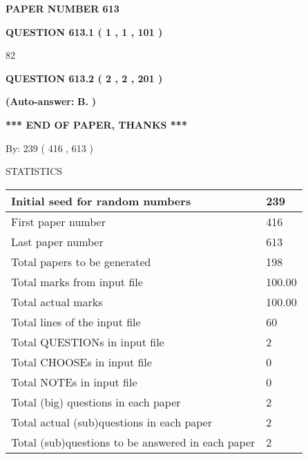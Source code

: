 \documentclass{ctexart}
\begin{document}
   
 {\textbf{ \Large{ PAPER NUMBER  613  }}}
   
   
   
   
  
  
{\textbf{\large{QUESTION
613.1 
 ( 1 , 1 , 101 )
}}}

82
  
  
{\textbf{\large{QUESTION
613.2 
 ( 2 , 2 , 201 )
}}}
 
 
{\textbf{(Auto-answer:}}
{\textbf{\large{
B.}}}
{\textbf{)}}
 
 
   
   
   
   
\vspace{1.0in} 
{\textbf{\large{ *** END OF PAPER, THANKS *** }}} 
   
   
\hspace{1.0in} By: 
 239 ( 416 ,  613 )
   
   
   
\vspace{0.2in}
\vspace{0.2in}
   
   
 \newpage
\setcounter{page}{1} 
   
   
 {\LARGE{STATISTICS}}
   
\vspace{0.2in}
   
 \begin{tabular}{|l|l|}
 \hline
 Initial seed for random numbers & 239  \\
\hline
 First paper number & 416  \\
\hline
 Last  paper number & 613  \\
\hline
 Total papers to be generated & 198  \\
\hline
Total marks from input file & 100.00 \\
\hline
Total actual marks & 100.00 \\
\hline
 Total lines of the input file & 60  \\
 \hline
 Total QUESTIONs in input file & 2  \\
\hline
 Total CHOOSEs in input file & 0  \\
\hline
 Total NOTEs in input file & 0  \\
\hline
 Total (big) questions in each paper & 2  \\
\hline
 Total actual (sub)questions in each paper & 2  \\
\hline
 Total (sub)questions to be answered in each paper & 2  \\
\hline
 \end{tabular}
   
\end{document}
